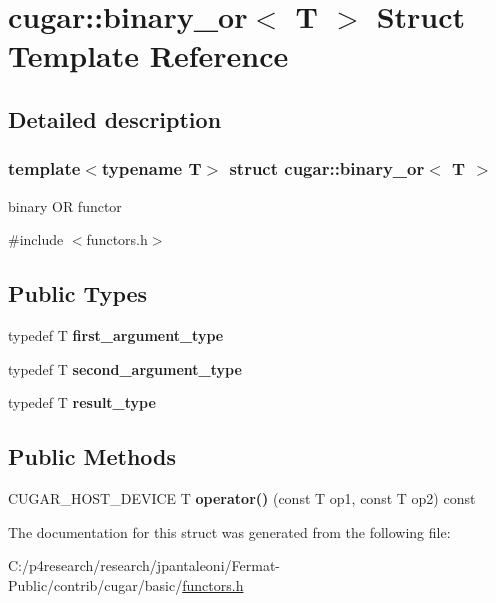 \hypertarget{structcugar_1_1binary__or}{}\section{cugar\+:\+:binary\+\_\+or$<$ T $>$ Struct Template Reference}
\label{structcugar_1_1binary__or}


\subsection{Detailed description}
\subsubsection*{template$<$typename T$>$\newline
struct cugar\+::binary\+\_\+or$<$ T $>$}

binary OR functor 

{\ttfamily \#include $<$functors.\+h$>$}

\subsection*{Public Types}
\begin{DoxyCompactItemize}
\item 
\mbox{\label{structcugar_1_1binary__or_aa4b226013ab9ca2ed916436620250570}} 
typedef T {\bfseries first\+\_\+argument\+\_\+type}
\item 
\mbox{\label{structcugar_1_1binary__or_a212a2c1a790204ac11e7a46252434a1d}} 
typedef T {\bfseries second\+\_\+argument\+\_\+type}
\item 
\mbox{\label{structcugar_1_1binary__or_ab74a19c718634c35321aa2b0b0bef17e}} 
typedef T {\bfseries result\+\_\+type}
\end{DoxyCompactItemize}
\subsection*{Public Methods}
\begin{DoxyCompactItemize}
\item 
\mbox{\label{structcugar_1_1binary__or_a736c1c2c69cb78f190acdb01e1331d31}} 
C\+U\+G\+A\+R\+\_\+\+H\+O\+S\+T\+\_\+\+D\+E\+V\+I\+CE T {\bfseries operator()} (const T op1, const T op2) const
\end{DoxyCompactItemize}


The documentation for this struct was generated from the following file\+:\begin{DoxyCompactItemize}
\item 
C\+:/p4research/research/jpantaleoni/\+Fermat-\/\+Public/contrib/cugar/basic/\hyperlink{functors_8h}{functors.\+h}\end{DoxyCompactItemize}
